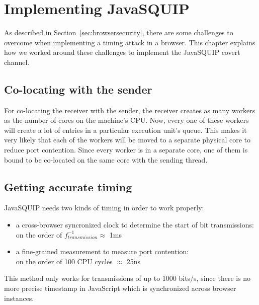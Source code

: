 \documentclass[11pt,
  titlepage=false,
]{scrreprt}
\begin{document}
\chapter{Implementing JavaSQUIP}
\label{ch:implementation}
As described in Section~\ref{sec:browsersecurity}, there are some challenges to overcome when implementing a timing attack in a browser.
This chapter explains how we worked around these challenges to implement the JavaSQUIP covert channel.

\section{Co-locating with the sender}
\label{sec:colocation}
For co-locating the receiver with the sender, the receiver creates as many workers as the number of cores on the machine's CPU.
Now, every one of these workers will create a lot of entries in a particular execution unit's queue.
This makes it very likely that each of the workers will be moved to a separate physical core to reduce port contention.
Since every worker is in a separate core, one of them is bound to be co-located on the same core with the sending thread.

\section{Getting accurate timing}
\label{sec:accurate-timing}
JavaSQUIP needs two kinds of timing in order to work properly:
\begin{itemize}
    \item a cross-browser syncronized clock to determine the start of bit transmissions:\\
    on the order of $f_{transmission}^{-1} \approx$ 1ms
    \item a fine-grained measurement to measure port contention:\\
    on the order of 100 CPU cycles $\approx$ 25ns
\end{itemize}

This method only works for transmissions of up to 1000 bits/s, since there is no more precise timestamp in JavaScript which is synchronized across browser instances.

\end{document}
